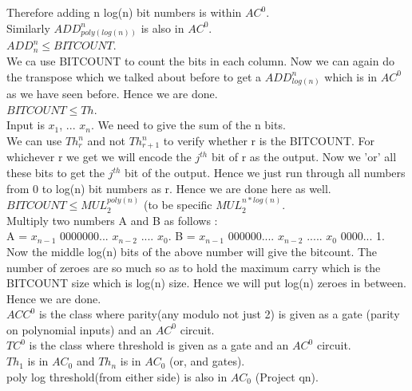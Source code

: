 \documentclass[solution,addpoints,12pt]{exam}
\begin{document}
Therefore adding n log(n) bit numbers is within ${AC}^0$.\\
Similarly ${ADD}_{poly(log(n))}^{n}$ is also in ${AC}^0$.\\

$ADD_{n}^{n} \le BITCOUNT$.\\
We ca use BITCOUNT to count the bits in each column. Now we can
again do the transpose which we talked about before to get a
${ADD}_{log(n)}^{n}$ which is in ${AC}^0$ as we have seen before.
Hence we are done.\\

$BITCOUNT \le Th$.\\
Input is $x_1$, ... $x_n$. We need to give the sum of the
n bits.\\
We can use $Th_{r}^{n}$ and not $Th_{r+1}^{n}$ to verify
whether r is the BITCOUNT. For whichever r we get we will encode the
$j^{th}$ bit of r as the output. Now we 'or' all these bits to get the
$j^{th}$ bit of the output. Hence we just run through all numbers
from 0 to log(n) bit numbers as r. Hence we are done here as well.\\

$BITCOUNT \le MUL_{2}^{poly(n)}$ (to be specific $MUL_{2}^{n*log(n)}$.\\
Multiply two numbers A and B as follows :\\
A = $x_{n-1}$ 0000000... $x_{n-2}$ .... $x_0$.
B = $x_{n-1}$ 000000.... $x_{n-2}$ ..... $x_0$ 0000... 1.\\
Now the middle log(n) bits of the above number will give the bitcount.
The number of zeroes are so much so as to hold the maximum carry which
is the BITCOUNT size which is log(n) size. Hence we will put log(n)
zeroes in between. Hence we are done.\\

${ACC}^0$ is the class where parity(any modulo not just 2) is given as a gate
(parity on polynomial inputs) and an ${AC}^0$ circuit.\\
${TC}^0$ is the class where threshold is given as a gate and an ${AC}^0$ circuit.\\

$Th_1$ is in $AC_0$ and $Th_n$ is in $AC_0$ (or, and gates).\\
poly log threshold(from either side) is also in $AC_0$ (Project qn).\\
\end{document}
